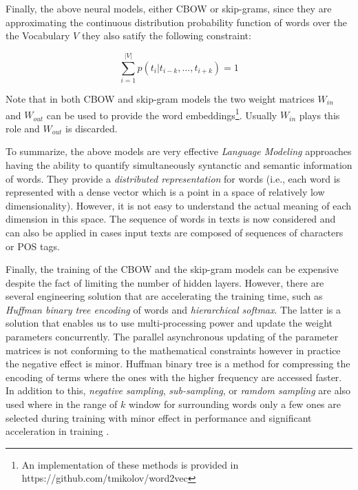 Finally, the above neural models, either CBOW or skip-grams, since they are approximating the continuous distribution probability function of words over the the Vocabulary $V$ they also satify the following constraint:

\begin{equation} \label{chap:word_embeddings:eq:nnet_condtraint}
	\sum_{i=1}^{|V|}{p(t_{i}|t_{i-k}, ... ,t_{i+k})} = 1
\end{equation}

Note that in both CBOW and skip-gram models the two weight matrices $W_{in}$ and $W_{out}$ can be used to provide the word embeddings\footnote{An implementation of these methods is provided in https://github.com/tmikolov/word2vec}. Usually $W_{in}$ plays this role and $W_{out}$ is discarded.


To summarize, the above models are very effective \textit{Language Modeling} approaches having the ability to quantify simultaneously syntanctic and semantic information of words. They provide a \textit{distributed representation} for words (i.e., each word is represented with a dense vector which is a point in a space of relatively low dimensionality). However, it is not easy to understand the actual meaning of each dimension in this space. The sequence of words in texts is now considered and can also be applied in cases input texts are composed of sequences of characters or POS tags.

Finally, the training of the CBOW and the skip-gram models can be expensive despite the fact of limiting the number of hidden layers. However, there are several engineering solution that are accelerating the training time, such as \textit{Huffman binary tree encoding} of words and \textit{hierarchical softmax}. The latter is a solution that enables us to use multi-processing power and update the weight parameters concurrently. The parallel asynchronous updating of the parameter matrices is not conforming to the mathematical constraints however in practice the negative effect is minor. Huffman binary tree is a method for compressing the encoding of terms where the ones with the higher frequency are accessed faster. In addition to this, \textit{negative sampling}, \textit{sub-sampling}, or \textit{ramdom sampling} are also used where in the range of $k$ window for surrounding words only a few ones are selected during training with minor effect in  performance and significant acceleration in training \parencite{mikolov2013efficient,mitra2018introduction}.  

